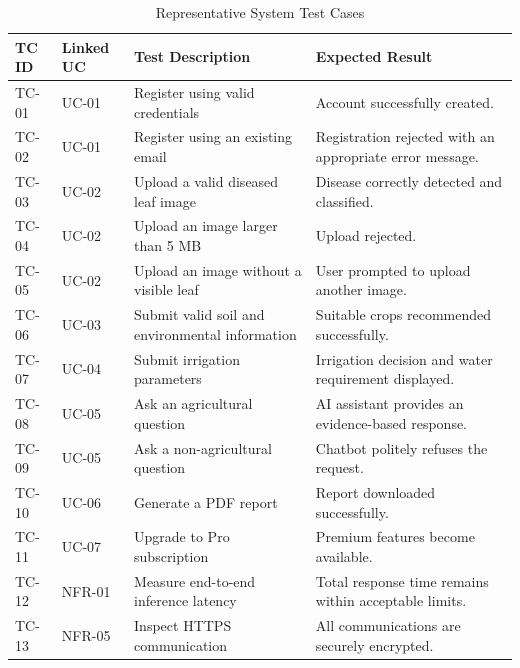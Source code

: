 \begin{table}[H]
\centering
\caption{Representative System Test Cases}
\label{tab:testcases}
\renewcommand{\arraystretch}{1.35}
\small
\begin{tabularx}{\textwidth}{l l X X}
\toprule
\textbf{TC ID} & \textbf{Linked UC} & \textbf{Test Description} & \textbf{Expected Result}\\
\midrule
TC-01 & UC-01 & Register using valid credentials & Account successfully created.\\

TC-02 & UC-01 & Register using an existing email & Registration rejected with an appropriate error message.\\

TC-03 & UC-02 & Upload a valid diseased leaf image & Disease correctly detected and classified.\\

TC-04 & UC-02 & Upload an image larger than 5 MB & Upload rejected.\\

TC-05 & UC-02 & Upload an image without a visible leaf & User prompted to upload another image.\\

TC-06 & UC-03 & Submit valid soil and environmental information & Suitable crops recommended successfully.\\

TC-07 & UC-04 & Submit irrigation parameters & Irrigation decision and water requirement displayed.\\

TC-08 & UC-05 & Ask an agricultural question & AI assistant provides an evidence-based response.\\

TC-09 & UC-05 & Ask a non-agricultural question & Chatbot politely refuses the request.\\

TC-10 & UC-06 & Generate a PDF report & Report downloaded successfully.\\

TC-11 & UC-07 & Upgrade to Pro subscription & Premium features become available.\\

TC-12 & NFR-01 & Measure end-to-end inference latency & Total response time remains within acceptable limits.\\

TC-13 & NFR-05 & Inspect HTTPS communication & All communications are securely encrypted.\\


\end{tabularx}
\end{table}
